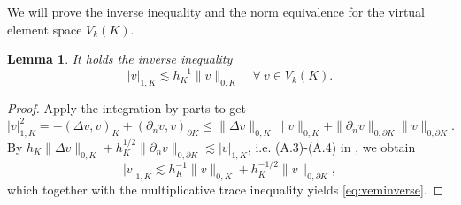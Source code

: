 \documentclass[10pt]{amsart}
\newtheorem{lemma}[theorem]{Lemma}
\numberwithin{equation}{section}
\begin{document}
We will prove the inverse inequality and the norm equivalence for the virtual element space $V_k(K)$.
\begin{lemma}\label{lem:veminverse}
It holds the inverse inequality
\begin{equation}\label{eq:veminverse}
|v|_{1,K}\lesssim h_K^{-1}\|v\|_{0,K}\quad\forall~v\in V_k(K).  
\end{equation}
\end{lemma}
\begin{proof}
Apply the integration by parts to get
\[
|v|_{1,K}^2=-(\Delta v,v)_K+(\partial_nv,v)_{\partial K}\leq\|\Delta v\|_{0,K}\|v\|_{0,K}+\|\partial_nv\|_{0,\partial K}\|v\|_{0,\partial K}.
\]
By $h_K\|\Delta v\|_{0,K}+h_K^{1/2}\|\partial_nv\|_{0,\partial K}\lesssim |v|_{1,K}$, i.e. (A.3)-(A.4) in \cite{ChenHuang2020ncvem}, we obtain
\[
|v|_{1,K}\lesssim h_K^{-1}\|v\|_{0,K}+h_K^{-1/2}\|v\|_{0,\partial K},
\]
which together with the multiplicative trace inequality yields \eqref{eq:veminverse}.
\end{proof}
\end{document}
